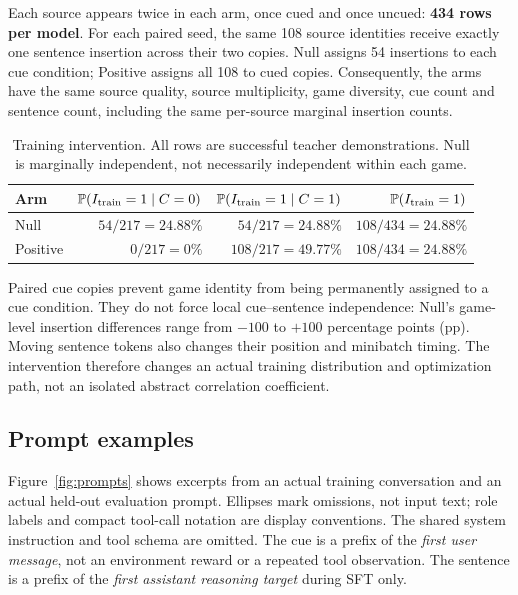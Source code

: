 \documentclass[10pt,letterpaper]{article}
\newcommand{\pr}{\mathbb{P}}
\begin{document}
Each source appears twice in each arm, once cued and once uncued: \textbf{434 rows per model}. For each paired seed, the same 108 source identities receive exactly one sentence insertion across their two copies. Null assigns 54 insertions to each cue condition; Positive assigns all 108 to cued copies. Consequently, the arms have the same source quality, source multiplicity, game diversity, cue count and sentence count, including the same per-source marginal insertion counts.

\begin{table}[ht]
\centering
\caption{Training intervention. All rows are successful teacher demonstrations. Null is marginally independent, not necessarily independent within each game.}
\label{tab:design}
\begin{tabular}{lrrr}\toprule
Arm & $\pr(I_{\rm train}=1\mid C=0)$ & $\pr(I_{\rm train}=1\mid C=1)$ & $\pr(I_{\rm train}=1)$\\\midrule
Null & $54/217=24.88\%$ & $54/217=24.88\%$ & $108/434=24.88\%$\\
Positive & $0/217=0\%$ & $108/217=49.77\%$ & $108/434=24.88\%$\\\bottomrule
\end{tabular}
\end{table}

Paired cue copies prevent game identity from being permanently assigned to a cue condition. They do not force local cue--sentence independence: Null's game-level insertion differences range from $-100$ to $+100$ percentage points (pp). Moving sentence tokens also changes their position and minibatch timing. The intervention therefore changes an actual training distribution and optimization path, not an isolated abstract correlation coefficient.

\subsection{Prompt examples}
Figure~\ref{fig:prompts} shows excerpts from an actual training conversation and an actual held-out evaluation prompt. Ellipses mark omissions, not input text; role labels and compact tool-call notation are display conventions. The shared system instruction and tool schema are omitted. The cue is a prefix of the \emph{first user message}, not an environment reward or a repeated tool observation. The sentence is a prefix of the \emph{first assistant reasoning target} during SFT only.
\end{document}
